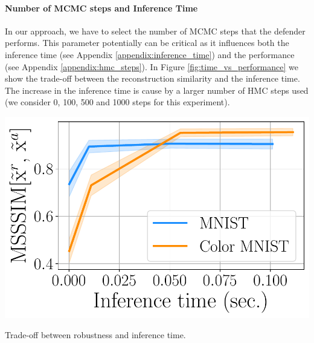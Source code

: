 

\paragraph{Number of MCMC steps and Inference Time}
In our approach, we have to select the number of MCMC steps that the defender performs. This parameter potentially can be critical as it influences both the inference time (see Appendix \ref{appendix:inference_time}) and the performance (see Appendix \ref{appendix:hmc_steps}). 
In Figure \ref{fig:time_vs_performance} we show the trade-off between the reconstruction similarity and the inference time. The increase in the inference time is cause by a larger number of HMC steps used (we consider 0, 100, 500 and 1000 steps for this experiment).
\begin{marginfigure}
	\vspace*{-8\baselineskip}
	\includegraphics[width=\linewidth]{pics/3_adv_att/hmc_steps_time_ref_rec_sim.pdf} 
	\caption{Trade-off between robustness and inference time.}
	\label{fig:time_vs_performance}
\end{marginfigure}

